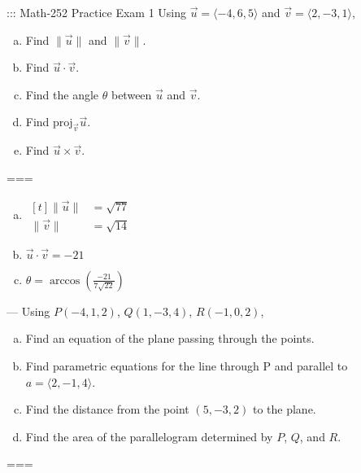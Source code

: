 ::: Math-252 Practice Exam 1
Using \(\vec u=\langle-4,6,5\rangle\) and \(\vec v=\langle 2,-3,1\rangle\),
\begin{enumerate}[a.]
  \item Find \(\|\vec u\|\) and \(\|\vec v\|\).
  \item Find \(\vec u\cdot\vec v\).
  \item Find the angle \(\theta\) between \(\vec u\) and \(\vec v\).
  \item Find \(\text{proj}_{\vec v}\vec u\).
  \item Find \(\vec u\times\vec v\).
\end{enumerate}
===
\begin{enumerate}[a.]
  \item
    \(\begin{aligned}[t]
      \|\vec u\|&=\sqrt{77} \\
      \|\vec v\|&=\sqrt{14}
    \end{aligned}\)
  \item \(\vec u\cdot\vec v=-21\)
  \item \(\displaystyle \theta=\arccos\left(\frac{-21}{7\sqrt{22}}\right)\)
\end{enumerate}
---
Using \(P(-4,1,2)\), \(Q(1,-3,4)\), \(R(-1,0,2)\),
\begin{enumerate}[a.]
  \item Find an equation of the plane passing through the points.
  \item Find parametric equations for the line through P and parallel to \(a=\langle 2,-1,4\rangle\).
  \item Find the distance from the point \((5,-3,2)\) to the plane.
  \item Find the area of the parallelogram determined by \(P\), \(Q\), and \(R\).
\end{enumerate}
===
